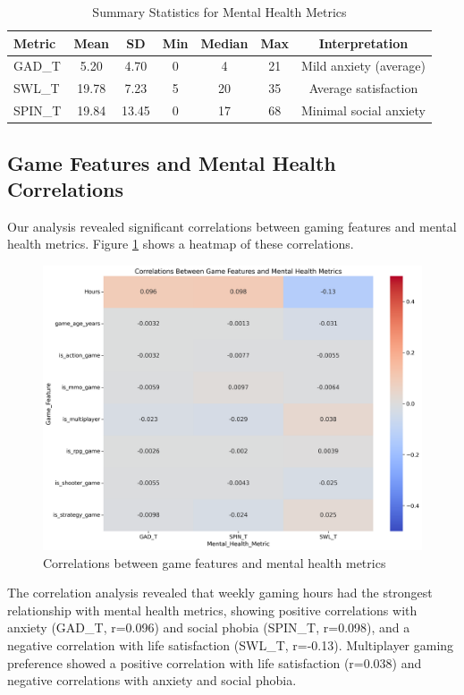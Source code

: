 \documentclass[12pt]{article}
\begin{document}
\begin{table}[h]
\centering
\caption{Summary Statistics for Mental Health Metrics}
\label{tab:mental_health_summary}
\begin{tabular}{lcccccc}
\toprule
\textbf{Metric} & \textbf{Mean} & \textbf{SD} & \textbf{Min} & \textbf{Median} & \textbf{Max} & \textbf{Interpretation} \\
\midrule
GAD\_T & 5.20 & 4.70 & 0 & 4 & 21 & Mild anxiety (average) \\
SWL\_T & 19.78 & 7.23 & 5 & 20 & 35 & Average satisfaction \\
SPIN\_T & 19.84 & 13.45 & 0 & 17 & 68 & Minimal social anxiety \\
\bottomrule
\end{tabular}
\end{table}

\subsection{Game Features and Mental Health Correlations}

Our analysis revealed significant correlations between gaming features and mental health metrics. Figure \ref{fig:correlations} shows a heatmap of these correlations.

\begin{figure}[H]
\centering
\includegraphics[width=\textwidth]{game_mental_health_correlations.png}
\caption{Correlations between game features and mental health metrics}
\label{fig:correlations}
\end{figure}
\noindent
The correlation analysis revealed that weekly gaming hours had the strongest relationship with mental health metrics, showing positive correlations with anxiety (GAD\_T, r=0.096) and social phobia (SPIN\_T, r=0.098), and a negative correlation with life satisfaction (SWL\_T, r=-0.13). Multiplayer gaming preference showed a positive correlation with life satisfaction (r=0.038) and negative correlations with anxiety and social phobia.
\end{document}
